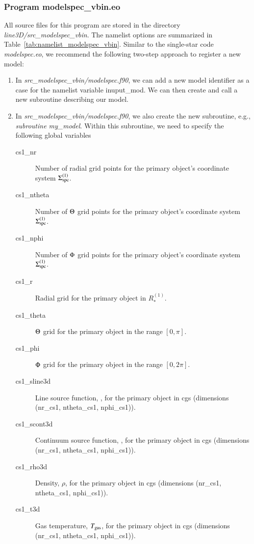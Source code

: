 \documentclass[10pt,a4paper]{article}
\begin{document}
\subsubsection{Program modelspec\_vbin.eo}
%
All source files for this program are stored in the directory
\textit{line3D/src\_modelspec\_vbin}. The namelist options are
summarized in Table~\ref{tab:namelist_modelspec_vbin}. Similar to the
single-star code \textit{modelspec.eo}, we recommend the following
two-step approach to register a new model:
\begin{enumerate}
  \item In \textit{src\_modelspec\_vbin/modelspec.f90}, we can add a new model identifier as a case for the namelist variable inuput\_mod. We can then create and call a new subroutine describing our model.
  \item In \textit{src\_modelspec\_vbin/modelspec.f90}, we also create
    the new subroutine, e.g., \textit{subroutine my\_model}. Within
    this subroutine, we need to specify the following global variables
    \begin{description}
    \item[cs1\_nr] Number of radial grid points for the primary object's coordinate system $\Sigma_{\rm spc}^{(1)}$.
    \item[cs1\_ntheta] Number of $\Theta$ grid points for the primary object's coordinate system $\Sigma_{\rm spc}^{(1)}$.
    \item[cs1\_nphi] Number of $\Phi$ grid points for the primary object's coordinate system $\Sigma_{\rm spc}^{(1)}$.
    \item[cs1\_r] Radial grid for the primary object in $R_\ast^{(1)}$.
    \item[cs1\_theta] $\Theta$ grid for the primary object in the range $[0,\pi]$.
    \item[cs1\_phi] $\Phi$ grid for the primary object in the range $[0,2\pi]$.
    \item[cs1\_sline3d] Line source function, \sline, for the primary object in cgs (dimensions (nr\_cs1, ntheta\_cs1, nphi\_cs1)).
    \item[cs1\_scont3d] Continuum source function, \scont, for the primary object in cgs (dimensions (nr\_cs1, ntheta\_cs1, nphi\_cs1)).
    \item[cs1\_rho3d] Density, $\rho$, for the primary object in cgs (dimensions (nr\_cs1, ntheta\_cs1, nphi\_cs1)).
    \item[cs1\_t3d] Gas temperature, $T_{\rm gas}$, for the primary object in cgs (dimensions (nr\_cs1, ntheta\_cs1, nphi\_cs1)).

\end{description}
\end{enumerate}
\end{document}
